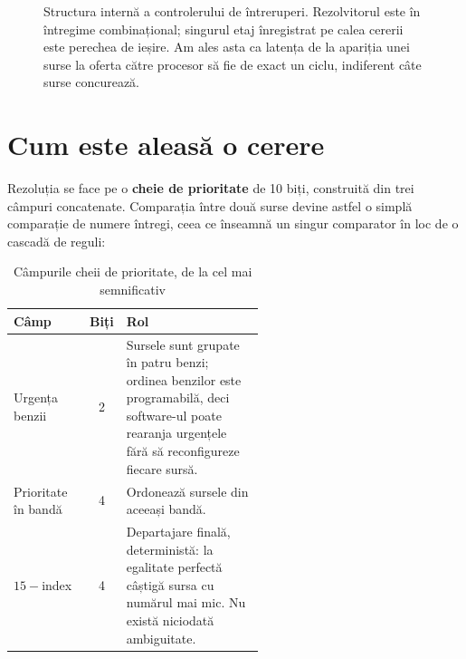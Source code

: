 \documentclass[11pt,openany]{report}
\begin{document}
\begin{figure}[H]
{}
\caption{Structura internă a controlerului de întreruperi. Rezolvitorul este în
întregime combinațional; singurul etaj înregistrat pe calea cererii este
perechea de ieșire. Am ales asta ca latența de la apariția unei surse la oferta
către procesor să fie de exact un ciclu, indiferent câte surse concurează.}
\label{fig:picblock}
\end{figure}

\section{Cum este aleasă o cerere}

Rezoluția se face pe o \textbf{cheie de prioritate} de 10 biți, construită din
trei câmpuri concatenate. Comparația între două surse devine astfel o simplă
comparație de numere întregi, ceea ce înseamnă un singur comparator în loc de o
cascadă de reguli:

\begin{table}[H]
\centering
\caption{Câmpurile cheii de prioritate, de la cel mai semnificativ}
\label{tab:key}
\small
\begin{tabular}{@{}lcL{0.55\linewidth}@{}}
\toprule
\textbf{Câmp} & \textbf{Biți} & \textbf{Rol} \\
\midrule
Urgența benzii & 2 &
  Sursele sunt grupate în patru benzi; ordinea benzilor este programabilă, deci
  software-ul poate rearanja urgențele fără să reconfigureze fiecare sursă. \\
Prioritate în bandă & 4 &
  Ordonează sursele din aceeași bandă. \\
$15-$index & 4 &
  Departajare finală, deterministă: la egalitate perfectă câștigă sursa cu
  numărul mai mic. Nu există niciodată ambiguitate. \\
\bottomrule
\end{tabular}
\end{table}
\end{document}
